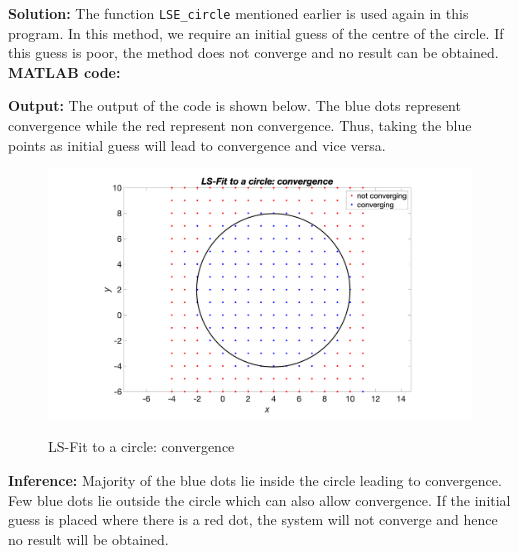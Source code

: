 \noindent \textbf{Solution:} The function \texttt{LSE\_circle} mentioned earlier is used again in this program. In this method, we require an initial guess of the centre of the circle. If this guess is poor, the method does not converge and no result can be obtained.\\
\noindent \textbf{MATLAB code:} 


\noindent \textbf{Output:} The output of the code is shown below. The blue dots represent convergence while the red represent non convergence. Thus, taking the blue points as initial guess will lead to convergence and vice versa.
\begin{figure}[H]
\centering
{\includegraphics[scale=0.15]{ass8_1.png}}
\caption{LS-Fit to a circle: convergence }
\label{LS-Fit to a circle: convergence }
\end{figure}

\noindent \textbf{Inference:} Majority of the blue dots lie inside the circle leading to convergence. Few blue dots lie outside the circle which can also allow convergence. If the initial guess is placed where there is a red dot, the system will not converge and hence no result will be obtained.